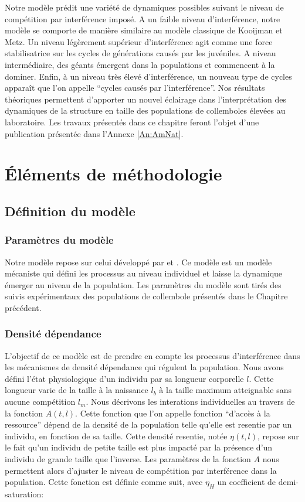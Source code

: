 Notre modèle prédit une variété de dynamiques possibles suivant le niveau de
compétition par interférence imposé. A un faible niveau d'interférence, notre
modèle se comporte de manière similaire au modèle classique de Kooijman et Metz.
Un niveau légèrement supérieur d'interférence agit comme une force
stabilisatrice sur les cycles de générations causés par les juvéniles. A niveau intermédiaire, des
géants émergent dans la populations et commencent à la dominer. Enfin, à un
niveau très élevé d'interférence, un nouveau type de cycles apparaît que l'on
appelle ``cycles causés par l'interférence''. Nos résultats théoriques
permettent d'apporter un nouvel éclairage dans l'interprétation des dynamiques de la
structure en taille des populations de collemboles élevées au laboratoire. Les
travaux présentés dans ce chapitre feront l'objet d'une publication présentée
dans l'Annexe \ref{An:AmNat}.

\section{Éléments de méthodologie}


\subsection{Définition du modèle}

\subsubsection{Paramètres du modèle}

Notre modèle repose sur celui développé par
\textcites[KM-model][]{kooijman1984a} et \textcites{de-roos1992a}. Ce modèle
est un modèle mécaniste qui défini les processus au niveau individuel et laisse
la dynamique émerger au niveau de la population. Les paramètres du
modèle sont tirés des suivis expérimentaux des populations de collembole
présentés dans le Chapitre précédent. 


\subsubsection{Densité dépendance}

L'objectif de ce modèle est de prendre en compte les
processus d'interférence dans les mécanismes de densité dépendance qui régulent la population. Nous avons
défini l'état physiologique d'un individu par sa longueur corporelle $l$. Cette
longueur varie de la taille à la naissance $l_b$ à la taille maximum atteignable
sans aucune compétition $l_m$. Nous décrivons les interations individuelles au
travers de la fonction $A(t,l)$. Cette fonction que l'on appelle fonction
``d'accès à la ressource'' dépend de la densité de la population telle qu'elle
est resentie par un individu, en fonction de sa taille. Cette densité resentie,
notée $\eta (t,l)$, repose sur le fait qu'un individu de petite taille est plus
impacté par la présence d'un individu de grande taille que l'inverse. Les
paramètres de la fonction $A$ nous permettent alors d'ajuster le niveau de
compétition par interférence dans la population. Cette fonction est définie
comme suit, avec $\eta _H$ un coefficient de demi-saturation:

